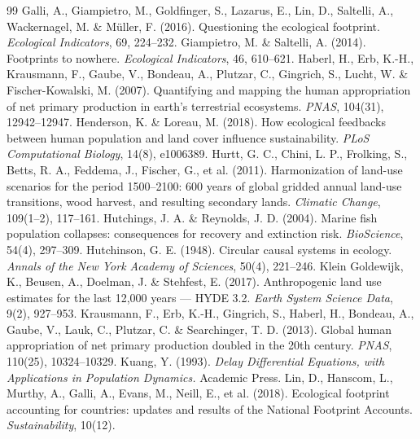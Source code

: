 \documentclass[preprint,12pt,authoryear]{elsarticle}
\begin{document}
\begin{thebibliography}{99}
 Galli, A., Giampietro, M., Goldfinger, S., Lazarus, E., Lin, D., Saltelli, A., Wackernagel, M. \& M\"uller, F. (2016). Questioning the ecological footprint. \emph{Ecological Indicators}, 69, 224--232.
 Giampietro, M. \& Saltelli, A. (2014). Footprints to nowhere. \emph{Ecological Indicators}, 46, 610--621.
 Haberl, H., Erb, K.-H., Krausmann, F., Gaube, V., Bondeau, A., Plutzar, C., Gingrich, S., Lucht, W. \& Fischer-Kowalski, M. (2007). Quantifying and mapping the human appropriation of net primary production in earth's terrestrial ecosystems. \emph{PNAS}, 104(31), 12942--12947.
 Henderson, K. \& Loreau, M. (2018). How ecological feedbacks between human population and land cover influence sustainability. \emph{PLoS Computational Biology}, 14(8), e1006389.
 Hurtt, G. C., Chini, L. P., Frolking, S., Betts, R. A., Feddema, J., Fischer, G., et al. (2011). Harmonization of land-use scenarios for the period 1500--2100: 600 years of global gridded annual land-use transitions, wood harvest, and resulting secondary lands. \emph{Climatic Change}, 109(1--2), 117--161.
 Hutchings, J. A. \& Reynolds, J. D. (2004). Marine fish population collapses: consequences for recovery and extinction risk. \emph{BioScience}, 54(4), 297--309.
 Hutchinson, G. E. (1948). Circular causal systems in ecology. \emph{Annals of the New York Academy of Sciences}, 50(4), 221--246.
 Klein Goldewijk, K., Beusen, A., Doelman, J. \& Stehfest, E. (2017). Anthropogenic land use estimates for the last 12,000 years --- HYDE 3.2. \emph{Earth System Science Data}, 9(2), 927--953.
 Krausmann, F., Erb, K.-H., Gingrich, S., Haberl, H., Bondeau, A., Gaube, V., Lauk, C., Plutzar, C. \& Searchinger, T. D. (2013). Global human appropriation of net primary production doubled in the 20th century. \emph{PNAS}, 110(25), 10324--10329.
 Kuang, Y. (1993). \emph{Delay Differential Equations, with Applications in Population Dynamics.} Academic Press.
 Lin, D., Hanscom, L., Murthy, A., Galli, A., Evans, M., Neill, E., et al. (2018). Ecological footprint accounting for countries: updates and results of the National Footprint Accounts. \emph{Sustainability}, 10(12).

\end{thebibliography}
\end{document}
